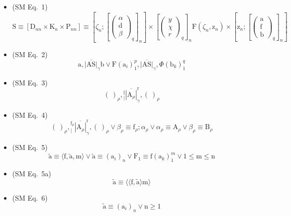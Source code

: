 \documentclass[12pt]{article}
\begin{document}
\begin{itemize}[label={},leftmargin=0pt]
    \item (SM Eq.\ 1) 
    \[
    \mathrm{S} \equiv [\mathrm{D}_{nn} \times \mathrm{K}_n \times \mathrm{P}_{nn}] \equiv \left[ \zeta_n; \left[ \begin{pmatrix} \alpha \\ \mathrm{d} \\ \beta \end{pmatrix}_q \right]_n \right] \times \left[ \begin{pmatrix} y \\ \chi \\ r \end{pmatrix}_q \right]_n \mathrm{F}(\zeta_n, \mathrm{z}_n) \times \left[ \mathrm{z}_n; \left[ \begin{pmatrix} \mathrm{a} \\ \mathrm{f} \\ \mathrm{b} \end{pmatrix}_q \right]_n \right]
    \]

    \item (SM Eq.\ 2) 
    \[
    \mathrm{a}, \overline{|\mathrm{AS}|}_\gamma \mathrm{b} \lor \mathrm{F}(\mathrm{a}_i)_1^p, \overline{|\mathrm{AS}|}_\gamma, \Phi(\mathrm{b}_k)_1^q
    \]

    \item (SM Eq.\ 3) 
    \[
    (\ )_\rho, \left. {}^{\mathrm{l}}_{|} \overline{|\mathrm{A}_\rho|} \right.^{\mathrm{r}}_\gamma, (\ )_\rho
    \]

    \item (SM Eq.\ 4) 
    \[
    (\ )_\rho, \left. {}^{\mathrm{f}_\rho}_{|} \overline{|\mathrm{A}_\rho|} \right.^{\mathrm{r}}_\gamma, (\ )_\rho \lor \beta_\rho \equiv \mathrm{f}_\rho; \alpha_\rho \lor \alpha_\rho \equiv \mathrm{A}_\rho \lor \beta_\rho \equiv \mathrm{B}_\rho
    \]

    \item (SM Eq.\ 5) 
    \[
    \tilde{\mathrm{a}} \equiv \langle \mathrm{f}, \tilde{\mathrm{a}}, \mathrm{m} \rangle \lor \tilde{\mathrm{a}} \equiv (\mathrm{a}_i)_n \lor \mathrm{F}_1 \equiv \mathrm{f}(\mathrm{a}_k)_1^m \lor 1 \le \mathrm{m} \le \mathrm{n}
    \]

    \item (SM Eq.\ 5a) 
    \[
    \tilde{\mathrm{a}} \equiv \langle\langle \mathrm{f}, \tilde{\mathrm{a}} \rangle \mathrm{m} \rangle
    \]

    \item (SM Eq.\ 6) 
    \[
    \tilde{\mathrm{a}} \equiv (\mathrm{a}_i)_n \lor \mathrm{n} \ge 1
    \]


\end{itemize}
\end{document}
